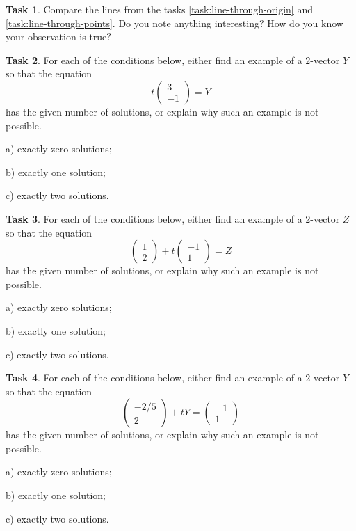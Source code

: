 \documentclass{tufte-book}
\theoremstyle{definition}
\newtheorem{task}{Task}
\begin{document}
\begin{task}
Compare the lines from the tasks \ref{task:line-through-origin} and \ref{task:line-through-points}. Do you note anything interesting? How do you know your observation is true?
\end{task}


\begin{task}
For each of the conditions below, either find an example of a $2$-vector $Y$ so that the equation
\[
t\begin{pmatrix}3\\-1\end{pmatrix} = Y
\]
has the given number of solutions, or explain why such an example is not possible.
\begin{compactitem}
\item[a)] exactly zero solutions;
\item[b)] exactly one solution; 
\item[c)] exactly two solutions.
\end{compactitem}
\end{task}



\begin{task}
For each of the conditions below, either find an example of a $2$-vector $Z$ so that the equation
\[
\begin{pmatrix}1\\2\end{pmatrix} + t\begin{pmatrix}-1\\1 \end{pmatrix} = Z
\]
has the given number of solutions, or explain why such an example is not possible.
\begin{compactitem}
\item[a)] exactly zero solutions;
\item[b)] exactly one solution; 
\item[c)] exactly two solutions.
\end{compactitem}
\end{task}

\begin{task}
For each of the conditions below, either find an example of a $2$-vector $Y$ so that the equation
\[
\begin{pmatrix}-2/5\\2\end{pmatrix} + tY = \begin{pmatrix}-1\\1 \end{pmatrix} 
\]
has the given number of solutions, or explain why such an example is not possible.
\begin{compactitem}
\item[a)] exactly zero solutions;
\item[b)] exactly one solution; 
\item[c)] exactly two solutions.
\end{compactitem}
\end{task}
\end{document}
